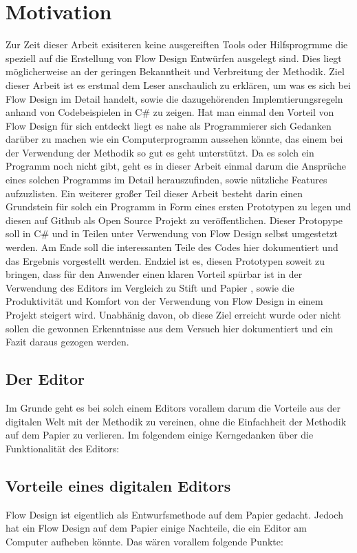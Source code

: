 \documentclass[11pt]{article}
\date{\today}
\title{}
\begin{document}
\section{Motivation}
\label{sec:orgheadline8}
Zur Zeit dieser Arbeit exisiteren keine ausgereiften Tools oder Hilfsprogrmme die speziell auf die Erstellung
von Flow Design Entwürfen ausgelegt sind. Dies liegt möglicherweise an der
geringen Bekanntheit und Verbreitung der Methodik.
Ziel dieser Arbeit ist es erstmal dem Leser anschaulich zu erklären, um was
es sich bei Flow Design im Detail handelt, sowie die dazugehörenden Implemtierungsregeln anhand von
Codebeispielen in C\# zu zeigen.
Hat man einmal den Vorteil von Flow Design für sich entdeckt liegt es nahe als
Programmierer sich Gedanken darüber zu machen wie ein Computerprogramm aussehen
könnte, das einem bei der Verwendung der Methodik so
gut es geht unterstützt. Da es solch ein Programm noch nicht gibt, geht es in
dieser Arbeit einmal darum die Ansprüche eines solchen Programms im Detail
herauszufinden, sowie nützliche Features aufzuzlisten. Ein weiterer großer Teil dieser
Arbeit besteht darin einen Grundstein für solch ein Programm in Form eines
ersten Prototypen zu legen und diesen auf Github als Open Source Projekt zu veröffentlichen.
Dieser Protopype soll in C\#  und in Teilen unter Verwendung von Flow Design selbst umgestetzt werden. 
Am Ende soll die interessanten Teile des Codes hier dokumentiert und das Ergebnis vorgestellt werden.
Endziel ist es, diesen Prototypen soweit zu bringen, dass für den Anwender einen klaren
Vorteil spürbar ist in der Verwendung des Editors im Vergleich zu Stift und Papier
, sowie die Produktivität und Komfort von der Verwendung von Flow Design in einem
Projekt steigert wird. Unabhänig davon, ob diese Ziel erreicht wurde oder nicht sollen die gewonnen
Erkenntnisse aus dem Versuch hier dokumentiert und ein Fazit daraus gezogen werden.

\subsection{Der Editor}
\label{sec:orgheadline1}
Im Grunde geht es bei solch einem Editors vorallem darum die Vorteile aus der digitalen Welt mit
der Methodik zu vereinen, ohne die Einfachheit der Methodik auf dem Papier zu
verlieren. Im folgendem einige Kerngedanken über die Funktionalität des Editors:

\subsection{Vorteile eines digitalen Editors}
\label{sec:orgheadline6}
Flow Design ist eigentlich als Entwurfsmethode auf dem Papier gedacht.
Jedoch hat ein Flow Design auf dem Papier einige Nachteile, die ein Editor am
Computer aufheben könnte. Das wären vorallem folgende Punkte:
\end{document}
